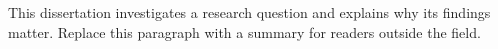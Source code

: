 This dissertation investigates a research question and explains why its findings matter. Replace this paragraph with a summary for readers outside the field.
